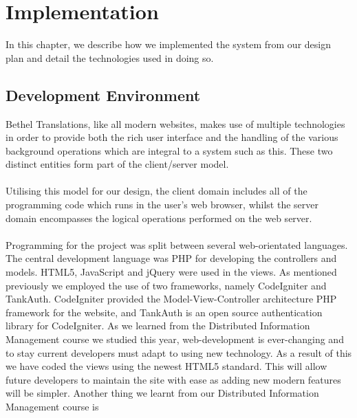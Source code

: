 \documentclass{l3proj}
\begin{document}
\chapter{Implementation}
\label{chap:impl}

In this chapter, we describe how we implemented the system from our design plan
and detail the technologies used in doing so.


\section{Development Environment}
\label{sect:dev-env}
Bethel Translations, like all modern websites, makes use of multiple
technologies in order to provide both the rich user interface and the handling
of the various background operations which are integral to a system such as this.
These two distinct entities form part of the client/server
model\cite{wik}.\\
\\
Utilising this model for our design, the client domain includes all of the programming code which runs in the
user's web browser, whilst the server domain encompasses the logical operations
performed on the web server.\\
\\
Programming for the project was split between several web-orientated languages.
The central development language was PHP for developing the controllers and
models. HTML5, JavaScript and jQuery were used in the views. As mentioned
previously we employed the use of two frameworks, namely CodeIgniter and
TankAuth. CodeIgniter provided the Model-View-Controller architecture PHP
framework for the website, and TankAuth is an open source authentication library
for CodeIgniter.\newline
\newline
As we learned from the Distributed Information Management course we studied this
year, web-development is ever-changing and to stay current developers must adapt
to using new technology. As a result of this we have coded the views using the
newest HTML5 standard. This will allow future developers to maintain the site
with ease as adding new modern features will be simpler.\newline
\newline
Another thing we learnt from our Distributed Information Management course is
\end{document}

